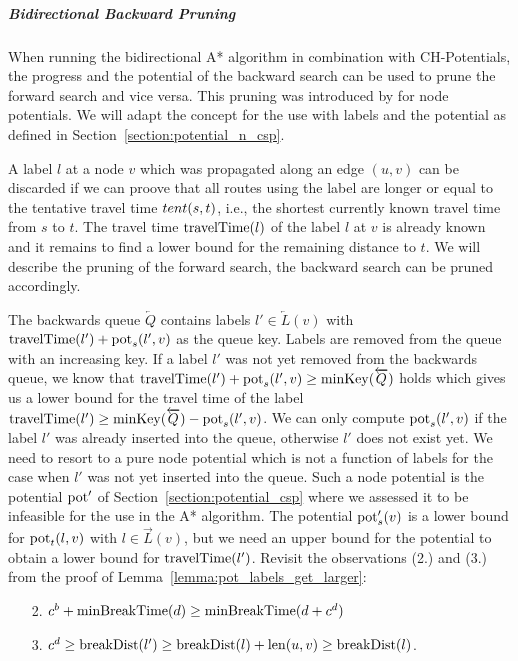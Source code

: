 \subparagraph{Bidirectional Backward Pruning}
When running the bidirectional A* algorithm in combination with CH-Potentials, the progress and the potential of the backward search can be used to prune the forward search and vice versa. This pruning was introduced by \cite{strasser:2018} for node potentials. We will adapt the concept for the use with labels and the potential as defined in Section~\ref{section:potential_n_csp}.

A label $l$ at a node $v$ which was propagated along an edge $(u,v)$ can be discarded if we can proove that all routes using the label are longer or equal to the tentative travel time $tent(s,t)$, i.e., the shortest currently known travel time from $s$ to $t$. The travel time $\operatorname{travelTime}(l)$ of the label $l$ at $v$ is already known and it remains to find a lower bound for the remaining distance to $t$. We will describe the pruning of the forward search, the backward search can be pruned accordingly.

The backwards queue $\overleftarrow{Q}$ contains labels $l' \in \overleftarrow{L}(v)$ with $\operatorname{travelTime}(l') + \operatorname{pot}_s(l', v)$ as the queue key. Labels are removed from the queue with an increasing key. If a label $l'$ was not yet removed from the backwards queue, we know that $\operatorname{travelTime}(l') + \operatorname{pot}_s(l',v) \ge \operatorname{minKey}(\overleftarrow{Q})$ holds which gives us a lower bound for the travel time of the label $\operatorname{travelTime}(l') \ge \operatorname{minKey}(\overleftarrow{Q}) - \operatorname{pot}_s(l',v)$. We can only compute $\operatorname{pot}_s(l',v)$ if the label $l'$ was already inserted into the queue, otherwise $l'$ does not exist yet. We need to resort to a pure node potential which is not a function of labels for the case when $l'$ was not yet inserted into the queue. Such a node potential is the potential $\operatorname{pot}'$ of Section~\ref{section:potential_csp} where we assessed it to be infeasible for the use in the A* algorithm. The potential $\operatorname{pot}'_s(v)$ is a lower bound for $\operatorname{pot}_t(l,v)$ with $l \in \overrightarrow{L}(v)$, but we need an upper bound for the potential to obtain a lower bound for $\operatorname{travelTime}(l')$. Revisit the observations (2.) and (3.) from the proof of Lemma~\ref{lemma:pot_labels_get_larger}:

\begin{enumerate}
	\item[2.] $c^b + \operatorname{minBreakTime}(d) \ge \operatorname{minBreakTime}(d + c^d)$
	\item[3.] $c^d \ge \operatorname{breakDist}(l') \ge \operatorname{breakDist}(l) + \operatorname{len}(u,v) \ge \operatorname{breakDist}(l)$.
\end{enumerate}

